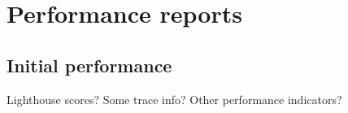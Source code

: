 
\chapter{Performance reports} %

\label{AppendixA} %

\section{Initial performance}

Lighthouse scores?
Some trace info?
Other performance indicators?

